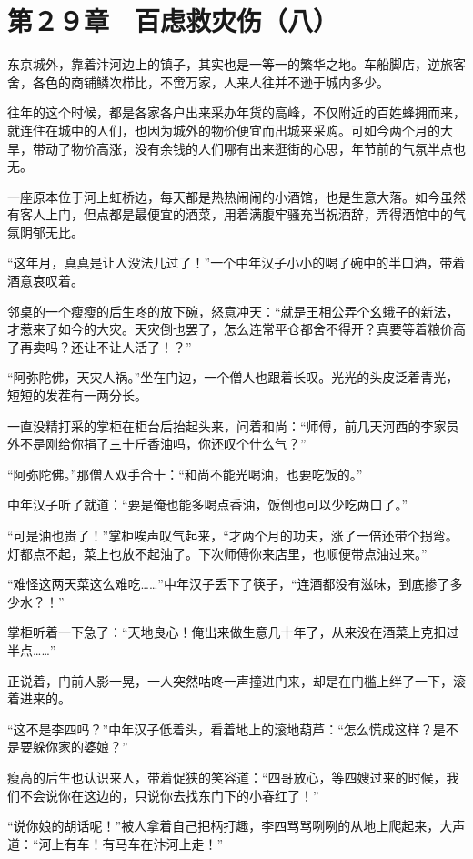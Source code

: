 \section{第２９章　百虑救灾伤（八）}

东京城外，靠着汴河边上的镇子，其实也是一等一的繁华之地。车船脚店，逆旅客舍，各色的商铺鳞次栉比，不啻万家，人来人往并不逊于城内多少。

往年的这个时候，都是各家各户出来采办年货的高峰，不仅附近的百姓蜂拥而来，就连住在城中的人们，也因为城外的物价便宜而出城来采购。可如今两个月的大旱，带动了物价高涨，没有余钱的人们哪有出来逛街的心思，年节前的气氛半点也无。

一座原本位于河上虹桥边，每天都是热热闹闹的小酒馆，也是生意大落。如今虽然有客人上门，但点都是最便宜的酒菜，用着满腹牢骚充当祝酒辞，弄得酒馆中的气氛阴郁无比。

“这年月，真真是让人没法儿过了！”一个中年汉子小小的喝了碗中的半口酒，带着酒意哀叹着。

邻桌的一个瘦瘦的后生咚的放下碗，怒意冲天：“就是王相公弄个幺蛾子的新法，才惹来了如今的大灾。天灾倒也罢了，怎么连常平仓都舍不得开？真要等着粮价高了再卖吗？还让不让人活了！？”

“阿弥陀佛，天灾人祸。”坐在门边，一个僧人也跟着长叹。光光的头皮泛着青光，短短的发茬有一两分长。

一直没精打采的掌柜在柜台后抬起头来，问着和尚：“师傅，前几天河西的李家员外不是刚给你捐了三十斤香油吗，你还叹个什么气？”

“阿弥陀佛。”那僧人双手合十：“和尚不能光喝油，也要吃饭的。”

中年汉子听了就道：“要是俺也能多喝点香油，饭倒也可以少吃两口了。”

“可是油也贵了！”掌柜唉声叹气起来，“才两个月的功夫，涨了一倍还带个拐弯。灯都点不起，菜上也放不起油了。下次师傅你来店里，也顺便带点油过来。”

“难怪这两天菜这么难吃……”中年汉子丢下了筷子，“连酒都没有滋味，到底掺了多少水？！”

掌柜听着一下急了：“天地良心！俺出来做生意几十年了，从来没在酒菜上克扣过半点……”

正说着，门前人影一晃，一人突然咕咚一声撞进门来，却是在门槛上绊了一下，滚着进来的。

“这不是李四吗？”中年汉子低着头，看着地上的滚地葫芦：“怎么慌成这样？是不是要躲你家的婆娘？”

瘦高的后生也认识来人，带着促狭的笑容道：“四哥放心，等四嫂过来的时候，我们不会说你在这边的，只说你去找东门下的小春红了！”

“说你娘的胡话呢！”被人拿着自己把柄打趣，李四骂骂咧咧的从地上爬起来，大声道：“河上有车！有马车在汴河上走！”

